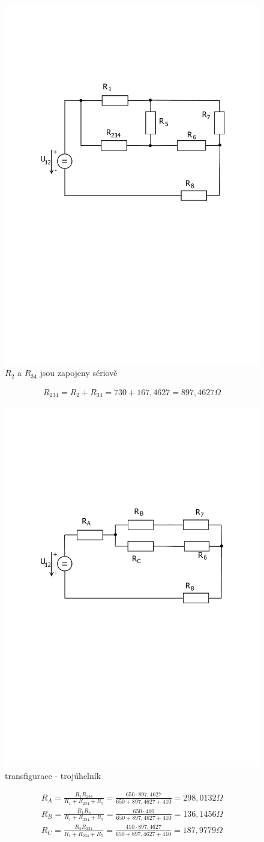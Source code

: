 	\begin{figure}[H]
		\center\includegraphics[width=0.6\linewidth]{obr/1_3}
		\caption*{$R_2$ a $R_{34}$ jsou zapojeny sériově}
	\end{figure}
	\begin{gather*}
		R_{234} = R_2 + R_{34} = 730 + 167,4627 = 897,4627 \Omega
	\end{gather*}

	\begin{figure}[H]
		\vspace{-1.1cm}
		\center\includegraphics[width=0.6\linewidth]{obr/1_4}
		\caption*{transfigurace - trojúhelník}
	\end{figure}
	\begin{gather*}
		R_A = \frac{R_1  R_{234}}{R_1 + R_{234} + R_5} = \frac{650 \cdot 897,4627}{650 +  897,4627 + 410} = 298,0132 \Omega \\
		R_B = \frac{R_1  R_5}{R_1 + R_{234} + R_5} = \frac{650 \cdot 410}{650 +  897,4627 + 410} = 136,1456 \Omega \\
		R_C = \frac{R_5  R_{234}}{R_1 + R_{234} + R_5} = \frac{410 \cdot 897,4627}{650 +  897,4627 + 410} = 187,9779 \Omega 
	\end{gather*}

